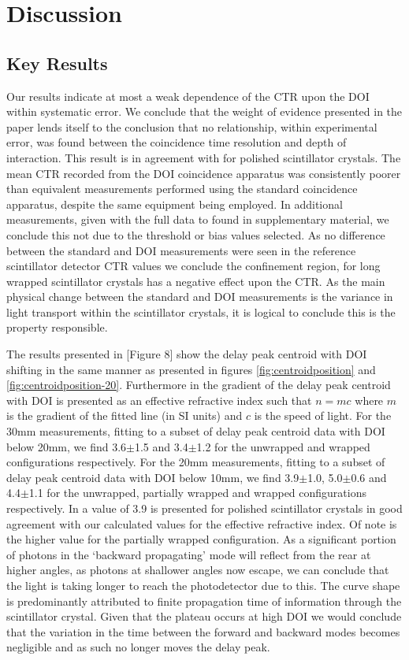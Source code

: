 \section{Discussion}
\label{sec:discussion}
\subsection{Key Results}
Our results indicate at most a weak dependence of the CTR upon the DOI within systematic error. We conclude that the weight of evidence presented in the paper lends itself to the conclusion that no relationship, within experimental error, was found between the coincidence time resolution and depth of interaction. This result is in agreement with \cite{Bircher_Shao_2012} for polished scintillator crystals. The mean CTR recorded from the DOI coincidence apparatus was consistently poorer than equivalent measurements performed using the standard coincidence apparatus, despite the same equipment being employed. In additional measurements, given with the full data to found in supplementary material, we conclude this not due to the threshold or bias values selected. As no difference between the standard and DOI measurements were seen in the reference scintillator detector CTR values we conclude the confinement region, for long wrapped scintillator crystals has a negative effect upon the CTR. As the main physical change between the standard and DOI measurements is the variance in light transport within the scintillator crystals, it is logical to conclude this is the property responsible.

The results presented in [Figure 8]\cite{Moses_Derenzo_1999} show the delay peak centroid with DOI shifting in the same manner as presented in figures \ref{fig:centroidposition} and \ref{fig:centroidposition-20}. Furthermore in \cite{Moses_Derenzo_1999} the gradient of  the delay peak centroid with DOI is presented as an effective refractive index such that $n=mc$ where $m$ is the gradient of the fitted line (in SI units) and $c$ is the speed of light. For the 30mm measurements, fitting to a subset of delay peak centroid data with DOI below 20mm, we find 3.6$\pm$1.5 and 3.4$\pm$1.2 for the unwrapped and wrapped configurations respectively.  For the 20mm measurements, fitting to a subset of delay peak centroid data with DOI below 10mm, we find 3.9$\pm$1.0, 5.0$\pm$0.6 and 4.4$\pm$1.1 for the unwrapped, partially wrapped and wrapped configurations respectively. In \cite{Moses_Derenzo_1999} a value of 3.9 is presented for polished scintillator crystals in good agreement with our calculated values for the effective refractive index. Of note is the higher value for the partially wrapped configuration. As a significant portion of photons in the `backward propagating' mode will reflect from the rear at higher angles, as photons at shallower angles now escape, we can conclude that the light is taking longer to reach the photodetector due to this. The curve shape is predominantly attributed to finite propagation time of information through the scintillator crystal. Given that the plateau occurs at high DOI we would conclude that the variation in the time between the forward and backward modes becomes negligible and as such no longer moves the delay peak.

